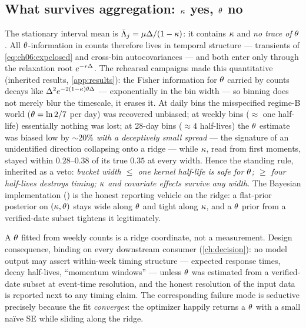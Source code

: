\subsection{What survives aggregation: $\kappa$ yes, $\theta$ no}\label{ch06:sec:ridge}

The stationary interval mean is
$\bar{\Lambda}_j = \mu\Delta/(1-\kappa)$: it contains $\kappa$ and
\emph{no trace of} $\theta$. All $\theta$-information in counts therefore
lives in temporal structure --- transients of
\cref{eq:ch06:expclosed} and cross-bin autocovariances --- and both enter
only through the relaxation root $e^{-r\Delta}$. The rehearsal campaigns
made this quantitative (inherited results, \cref{app:results}): the
Fisher information for $\theta$ carried by counts decays like
$\Delta^{2}e^{-2(1-\kappa)\theta\Delta}$ --- exponentially in the bin
width --- so binning does not merely blur the timescale, it erases it. At
daily bins the misspecified regime-B world ($\theta = \ln 2/7$ per day)
was recovered unbiased; at weekly bins ($\approx$ one half-life)
essentially nothing was lost; at 28-day bins ($\approx 4$ half-lives) the
$\theta$ estimate was biased low by $\sim20\%$ \emph{with a deceptively
small spread} --- the signature of an unidentified direction collapsing
onto a ridge --- while $\kappa$, read from first moments, stayed within
$0.28$--$0.38$ of its true $0.35$ at every width. Hence the standing rule,
inherited as a veto: \emph{bucket width $\le$ one kernel half-life is safe
for $\theta$; $\ge$ four half-lives destroys timing; $\kappa$ and
covariate effects survive any width}. The Bayesian implementation
() is the honest reporting vehicle on the ridge: a
flat-prior posterior on $(\kappa,\theta)$ stays wide along $\theta$ and
tight along $\kappa$, and a $\theta$ prior from a verified-date subset
tightens it legitimately.

\begin{warning}\label{warn:ch06:timingclaims}
A $\theta$ fitted from weekly counts is a ridge coordinate, not a
measurement. Design consequence, binding on every downstream consumer
(\cref{ch:decision}): no model output may assert within-week timing
structure --- expected response times, decay half-lives, ``momentum
windows'' --- unless $\theta$ was estimated from a verified-date subset at
event-time resolution, and the honest resolution of the input data is
reported next to any timing claim. The corresponding failure mode is
seductive precisely because the fit \emph{converges}: the optimizer happily
returns a $\theta$ with a small na\"ive SE while sliding along the ridge.
\end{warning}

